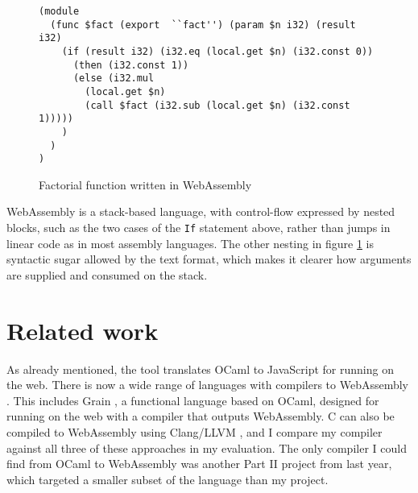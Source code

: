 \begin{figure}[H]
\begin{verbatim}
(module
  (func $fact (export  ``fact'') (param $n i32) (result i32)
    (if (result i32) (i32.eq (local.get $n) (i32.const 0))
      (then (i32.const 1))
      (else (i32.mul 
        (local.get $n) 
        (call $fact (i32.sub (local.get $n) (i32.const 1)))))
    )
  )
)
\end{verbatim}
\caption{Factorial function written in WebAssembly} 
\label{fig:wasm}
\end{figure}

WebAssembly is a stack-based language, with control-flow expressed by nested blocks, such as the two cases of the \verb|If| statement above, rather than jumps in linear code as in most assembly languages. The other nesting in figure \ref{fig:wasm} is syntactic sugar allowed by the text format, which makes it clearer how arguments are supplied and consumed on the stack.


\section{Related work}
As already mentioned, the  \jsofocaml{} tool translates OCaml to JavaScript for running on the web. There is now a wide range of languages with compilers to WebAssembly \cite{langauges-to-wasm}. This includes Grain \cite{grain}, a functional language based on OCaml, designed for running on the web with a compiler that outputs WebAssembly. C can also be compiled to WebAssembly using Clang/LLVM \cite{clang-llvm}, and I compare my compiler against all three of these approaches in my evaluation.
The only compiler I could find from OCaml to WebAssembly was another Part II project from last year, which targeted a smaller subset of the language than my project.


